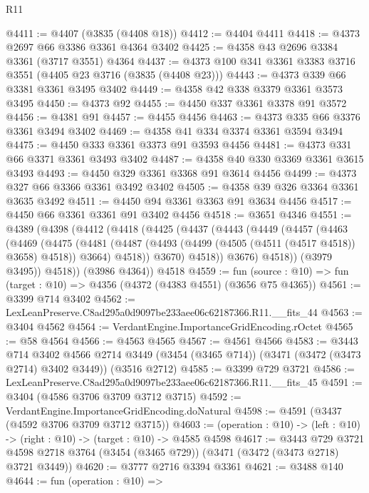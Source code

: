 \begin{lexlean}{R11}
\begin{coremodule}
@4411 := @4407 (@3835 (@4408 @18))
@4412 := @4404 @4411
@4418 := @4373 @2697 @66 @3386 @3361 @4364 @3402
@4425 := @4358 @43 @2696 @3384 @3361 (@3717 @3551) @4364
@4437 := @4373 @100 @341 @3361 @3383 @3716 @3551 (@4405 @23 @3716 (@3835 (@4408 @23)))
@4443 := @4373 @339 @66 @3381 @3361 @3495 @3402
@4449 := @4358 @42 @338 @3379 @3361 @3573 @3495
@4450 := @4373 @92
@4455 := @4450 @337 @3361 @3378 @91 @3572
@4456 := @4381 @91
@4457 := @4455 @4456
@4463 := @4373 @335 @66 @3376 @3361 @3494 @3402
@4469 := @4358 @41 @334 @3374 @3361 @3594 @3494
@4475 := @4450 @333 @3361 @3373 @91 @3593 @4456
@4481 := @4373 @331 @66 @3371 @3361 @3493 @3402
@4487 := @4358 @40 @330 @3369 @3361 @3615 @3493
@4493 := @4450 @329 @3361 @3368 @91 @3614 @4456
@4499 := @4373 @327 @66 @3366 @3361 @3492 @3402
@4505 := @4358 @39 @326 @3364 @3361 @3635 @3492
@4511 := @4450 @94 @3361 @3363 @91 @3634 @4456
@4517 := @4450 @66 @3361 @3361 @91 @3402 @4456
@4518 := @3651 @4346
@4551 := @4389
    (@4398
      (@4412
        (@4418
          (@4425
            (@4437
              (@4443
                (@4449
                  (@4457
                    (@4463
                      (@4469
                        (@4475
                          (@4481
                            (@4487 (@4493 (@4499 (@4505 (@4511 (@4517 @4518)) @3658) @4518)) @3664)
                            @4518))
                        @3670)
                      @4518))
                  @3676)
                @4518))
            (@3979 @3495))
          @4518))
      (@3986 @4364))
    @4518
@4559 := fun (source : @10) => fun (target : @10) => @4356 (@4372 (@4383 @4551) (@3656 @75 @4365))
@4561 := @3399 @714 @3402
@4562 := LexLeanPreserve.C8ad295a0d9097be233aee06c62187366.R11.__fits_44
@4563 := @3404 @4562
@4564 := VerdantEngine.ImportanceGridEncoding.rOctet
@4565 := @58 @4564
@4566 := @4563 @4565
@4567 := @4561 @4566
@4583 := @3443
    @714
    @3402
    @4566
    @2714
    @3449
    (@3454 (@3465 @714))
    (@3471 (@3472 (@3473 @2714) @3402 @3449))
    (@3516 @2712)
@4585 := @3399 @729 @3721
@4586 := LexLeanPreserve.C8ad295a0d9097be233aee06c62187366.R11.__fits_45
@4591 := @3404 (@4586 @3706 @3709 @3712 @3715)
@4592 := VerdantEngine.ImportanceGridEncoding.doNatural
@4598 := @4591 (@3437 (@4592 @3706 @3709 @3712 @3715))
@4603 := (operation : @10) -> (left : @10) -> (right : @10) -> (target : @10) -> @4585 @4598
@4617 := @3443
    @729
    @3721
    @4598
    @2718
    @3764
    (@3454 (@3465 @729))
    (@3471 (@3472 (@3473 @2718) @3721 @3449))
@4620 := @3777 @2716 @3394 @3361
@4621 := @3488 @140
@4644 := fun (operation : @10) =>

\end{coremodule}
\end{lexlean}

